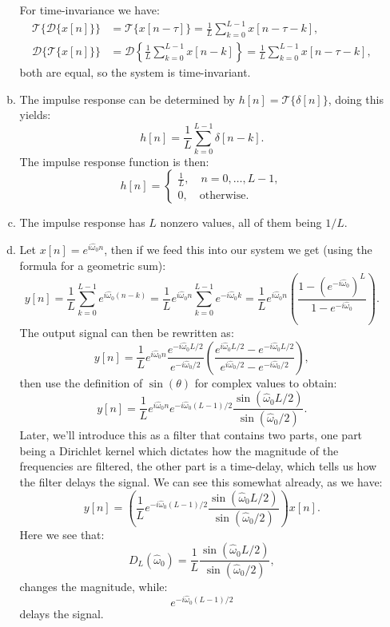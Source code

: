 \begin{enumerate}
\begin{enumerate}[a)]
For time-invariance we have:
\begin{align*}
    \mathcal{T}\{\mathcal{D}\{x[n]\}\}&=\mathcal{T}\{x[n-\tau]\}=\frac{1}{L}\sum_{k=0}^{L-1}x[n-\tau-k], \\
    \mathcal{D}\{\mathcal{T}\{x[n]\}\}&=\mathcal{D}\left\{\frac{1}{L}\sum_{k=0}^{L-1}x[n-k]\right\}=\frac{1}{L}\sum_{k=0}^{L-1}x[n-\tau-k],
\end{align*}
both are equal, so the system is time-invariant. 

\item The impulse response can be determined by $h[n]=\mathcal{T}\{\delta[n]\}$, doing this yields:
$$h[n]=\frac{1}{L}\sum_{k=0}^{L-1}\delta[n-k].$$
The impulse response function is then:
$$h[n]=\begin{cases}
    \frac{1}{L}, \quad n=0,\hdots,L-1, \\
    0, \quad \text{otherwise}.
\end{cases}$$

\item The impulse response has $L$ nonzero values, all of them being $1/L$. 

\item Let $x[n]=e^{i\hat{\omega}_{0}n}$, then if we feed this into our system we get (using the formula for a geometric sum):
$$y[n]=\frac{1}{L}\sum_{k=0}^{L-1}e^{i\hat{\omega}_{0}(n-k)}=\frac{1}{L}e^{i\hat{\omega}_{0}n}\sum_{k=0}^{L-1}e^{-i\hat{\omega}_{0}k}
=\frac{1}{L}e^{i\hat{\omega}_{0}n}\left(\frac{1-(e^{-i\hat{\omega}_{0}})^{L}}{1-e^{-i\hat{\omega}_{0}}}\right).$$
The output signal can then be rewritten as:
$$y[n] = \frac{1}{L}e^{i\hat{\omega}_{0}n}\frac{e^{-i\hat{\omega}_{0}L/2}}{e^{-i\hat{\omega}_{0}/2}}\left(\frac{e^{i\hat{\omega}_{0}L/2} - e^{-i\hat{\omega}_{0}L/2}}{e^{i\hat{\omega}_{0}/2} - e^{-i\hat{\omega}_{0}/2}}\right),$$
then use the definition of $\sin(\theta)$ for complex values to obtain:
$$y[n] = \frac{1}{L}e^{i\hat{\omega}_{0}n}e^{-i\hat{\omega}_{0}(L - 1)/2}\frac{\sin(\hat{\omega}_{0}L/2)}{\sin(\hat{\omega}_{0}/2)}.$$
Later, we'll introduce this as a filter that contains two parts, one part being a Dirichlet kernel which dictates how the magnitude of the frequencies are filtered, 
the other part is a time-delay, which tells us how the filter delays the signal. We can see this somewhat already, as we have:
$$y[n] = \left(\frac{1}{L}e^{-i\hat{\omega}_{0}(L - 1)/2}\frac{\sin(\hat{\omega}_{0}L/2)}{\sin(\hat{\omega}_{0}/2)}\right)x[n].$$
Here we see that:
$$D_{L}(\hat{\omega}_{0})=\frac{1}{L}\frac{\sin(\hat{\omega}_{0}L/2)}{\sin(\hat{\omega}_{0}/2)},$$
changes the magnitude, while:
$$e^{-i\hat{\omega}_{0}(L - 1)/2}$$
delays the signal. 


\end{enumerate}
\end{enumerate}
